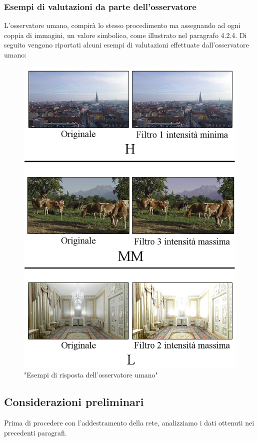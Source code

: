 \documentclass[a4paper,11pt]{article}
\begin{document}
    \subsubsection{Esempi di valutazioni da parte dell'osservatore}
    L'osservatore umano, compirà lo stesso procedimento ma assegnando ad ogni coppia di immagini, un valore simbolico, come illustrato nel paragrafo 4.2.4.
    Di seguito vengono riportati alcuni esempi di valutazioni effettuate dall'osservatore umano:
    \begin{figure}[h]
        \centering
        \includegraphics[scale=0.3]{confronto.png}
        \caption{"Esempi di risposta dell'osservatore umano"}
    \end{figure}
    \newpage
    \subsection{Considerazioni preliminari}
    Prima di procedere con l'addestramento della rete, analizziamo i dati ottenuti nei precedenti paragrafi. 
\end{document}
